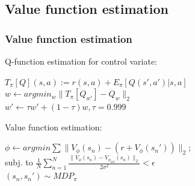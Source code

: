 \documentclass{beamer}
\begin{document}
\subsection{Value function estimation}
\begin{frame}

\frametitle{Value function estimation}
Q-function estimation for control variate:\\

\begin{center}
\vspace{1mm}

{
$T_\pi[Q](s,a) := r(s,a) + E_\pi[Q(s',a') | s,a]$\\

$w \leftarrow argmin_w \| T_\pi[Q_{w'}] - Q_w \|_2$\\
\vspace{1mm}
$ w' \leftarrow \tau w' + (1-\tau) w, \tau = 0.999$
}
\end{center}

\vspace{4mm}

Value function estimation:\\

\begin{center}
\vspace{1mm}
{
$\phi \leftarrow argmin \sum \| V_\phi(s_n) - (r + V_\phi(s_n')) \|_2$;\\

subj. to $\frac{1}{N} \sum_{n=1}^N \frac{\| V_\phi(s_n) - V_{\phi_{old}}(s_n) \|_2} {2\sigma^2} < \epsilon$\\
\vspace{1mm}
$(s_n,s_n') \sim MDP_\pi$
}

\end{center}

\end{frame}
\end{document}
